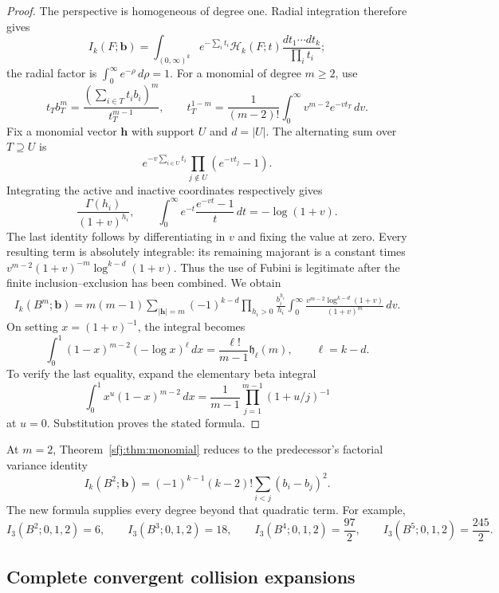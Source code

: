 \documentclass[11pt,letterpaper]{article}
\numberwithin{equation}{section}
\theoremstyle{definition}
\theoremstyle{remark}
\begin{document}
\begin{proof}
The perspective is homogeneous of degree one.  Radial integration
therefore gives
\[
 I_k(F;\boldsymbol b)=
 \int_{(0,\infty)^k} e^{-\sum_i t_i}
            \mathcal H_k(F;t)\frac{dt_1\cdots dt_k}{\prod_i t_i};
\]
the radial factor is $\int_0^\infty e^{-\rho}\,d\rho=1$.
For a monomial of degree $m\ge2$, use
\[
 t_T b_T^m=\frac{(\sum_{i\in T}t_i b_i)^m}{t_T^{m-1}},\qquad
 t_T^{1-m}=\frac1{(m-2)!}\int_0^\infty
                      v^{m-2}e^{-vt_T}\,dv.
\]
Fix a monomial vector $\boldsymbol h$ with support $U$ and $d=|U|$.
The alternating sum over $T\supseteq U$ is
\[
 e^{-v\sum_{i\in U}t_i}
             \prod_{j\notin U}(e^{-vt_j}-1).
\]
Integrating the active and inactive coordinates respectively gives
\[
 \frac{\Gamma(h_i)}{(1+v)^{h_i}},\qquad
 \int_0^\infty e^{-t}\frac{e^{-vt}-1}{t}\,dt=-\log(1+v).
\]
The last identity follows by differentiating in $v$ and fixing the
value at zero.  Every resulting term is absolutely integrable: its
remaining majorant is a constant times
$v^{m-2}(1+v)^{-m}\log^{k-d}(1+v)$.  Thus the use of Fubini is
legitimate after the finite inclusion--exclusion has been combined.
We obtain
\begin{align*}
 I_k(B^m;\boldsymbol b)
  =m(m-1)\sum_{|\boldsymbol h|=m}
     (-1)^{k-d}\prod_{h_i>0}\frac{b_i^{h_i}}{h_i}
       \int_0^\infty
        \frac{v^{m-2}\log^{k-d}(1+v)}{(1+v)^m}\,dv.
\end{align*}
On setting $x=(1+v)^{-1}$, the integral becomes
\[
 \int_0^1(1-x)^{m-2}(-\log x)^{\ell}\,dx
       =\frac{\ell!}{m-1}\mathfrak h_\ell(m),\qquad \ell=k-d.
\]
To verify the last equality, expand the elementary beta integral
\[
 \int_0^1x^u(1-x)^{m-2}\,dx
 =\frac1{m-1}\prod_{j=1}^{m-1}(1+u/j)^{-1}
\]
at $u=0$.  Substitution proves the stated formula.
\end{proof}

At $m=2$, Theorem~\ref{sfj:thm:monomial} reduces to the predecessor's
factorial variance identity
\begin{equation}\label{sfj:eq:quadratic}
 I_k(B^2;\boldsymbol b)
   =(-1)^{k-1}(k-2)!\sum_{i<j}(b_i-b_j)^2.
\end{equation}
The new formula supplies every degree beyond that quadratic term.  For
example,
\begin{equation}\label{sfj:eq:three-polynomials}
 I_3(B^2;0,1,2)=6,\qquad I_3(B^3;0,1,2)=18,\qquad
 I_3(B^4;0,1,2)=\frac{97}{2},\qquad
 I_3(B^5;0,1,2)=\frac{245}{2}.
\end{equation}

\subsection{Complete convergent collision expansions}
\end{document}
